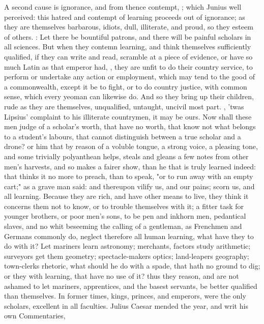 A second cause is ignorance, and from thence contempt, ; which Junius well perceived:
this hatred and contempt of learning proceeds out of
ignorance; as they are themselves barbarous, idiots, dull,
illiterate, and proud, so they esteem of others. : Let there be bountiful patrons, and there will be
painful scholars in all sciences. But when they contemn learning, and think
themselves sufficiently qualified, if they can write and read, scramble at a
piece of evidence, or have so much Latin as that emperor had, , they are unfit to do their
country service, to perform or undertake any action or employment, which may
tend to the good of a commonwealth, except it be to fight, or to do country
justice, with common sense, which every yeoman can likewise do. And so they
bring up their children, rude as they are themselves, unqualified, untaught,
uncivil most part. ,
\etc{} 'twas Lipsius' complaint to his illiterate countrymen, it may be ours.
Now shall these men judge of a scholar's worth, that have no worth, that know
not what belongs to a student's labours, that cannot distinguish between a true
scholar and a drone? or him that by reason of a voluble tongue, a strong voice,
a pleasing tone, and some trivially polyanthean helps, steals and gleans a few
notes from other men's harvests, and so makes a fairer show, than he that is
truly learned indeed: that thinks it no more to preach, than to speak,
"or to run away with an empty cart;" as a grave man said:
and thereupon vilify us, and our pains; scorn us, and all learning.
Because they are rich, and have other means to live, they
think it concerns them not to know, or to trouble themselves with it; a fitter
task for younger brothers, or poor men's sons, to be pen and inkhorn men,
pedantical slaves, and no whit beseeming the calling of a gentleman, as
Frenchmen and Germans commonly do, neglect therefore all human learning, what
have they to do with it? Let mariners learn astronomy; merchants, factors study
arithmetic; surveyors get them geometry; spectacle-makers optics; land-leapers
geography; town-clerks rhetoric, what should he do with a spade, that hath no
ground to dig; or they with learning, that have no use of it? thus they reason,
and are not ashamed to let mariners, apprentices, and the basest servants, be
better qualified than themselves. In former times, kings, princes, and
emperors, were the only scholars, excellent in all faculties. Julius Caesar
mended the year, and writ his own Commentaries,

